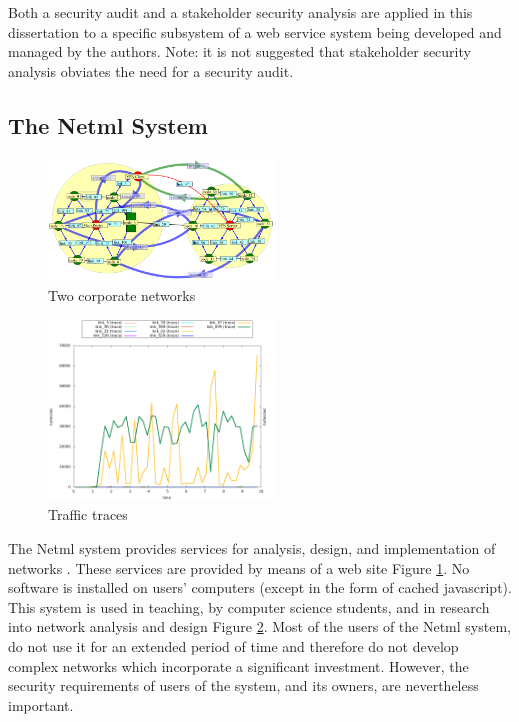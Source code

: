 Both a security audit and a stakeholder security analysis
are applied in this dissertation to a specific subsystem of a web
service system being developed and managed by the authors.
Note: it is not suggested that stakeholder security analysis obviates
the need for a security audit.

\subsection{The Netml System}
\begin{figure}
	\centering
		\includegraphics[width=6cm]{figures/vpn.png}
\caption{Two corporate networks }
\label{corporatenetwork}
\end{figure}

\begin{figure}
	\centering
		\includegraphics[width=6cm]{figures/vpn_traffic.png}
\caption{Traffic traces}
\label{Traffictraces}
\end{figure}

The Netml system provides services for analysis, design, and implementation
of networks \cite{addie2011netml}. These services are provided by means of a web
site Figure \ref{corporatenetwork}. No software is installed on users' computers (except in the form
of cached javascript). This system is used in teaching, by
computer science students, and in research into network analysis and design Figure  \ref{Traffictraces}. 
\iflonger
Most of the users of the Netml system, do not use it for an extended period of
time and therefore do not develop complex networks which incorporate a significant
investment. However, the security requirements of users of the system, and
its owners, are nevertheless important.
\fi


